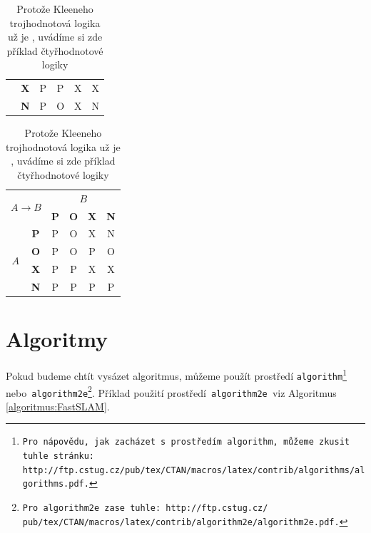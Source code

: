 \documentclass[a4paper,11pt]{article}
\begin{document}
\begin{table}[h]
\begin{center}
\begin{tabular}{|c|c|c|c|c|c|}
                    & \textbf{X} & P & P & X & X \\\cline{2-6}
                    & \textbf{N} & P & O & X & N \\\hline
\end{tabular}
\begin{tabular}{|c|c|c|c|c|c|}\hline
\multicolumn{2}{|c|}{\multirow{2}{*}{$A \rightarrow B$}} & \multicolumn{4}{c|}{$B$}\\\cline{3-6}
\multicolumn{2}{|c|}{} & \textbf{P} & \textbf{O} & \textbf{X} & \textbf{N}\\\hline
\multirow{4}{*}{$A$} & \textbf{P} & P & O & X & N \\\cline{2-6}
                    & \textbf{O} & P & O & P  & O \\\cline{2-6}
                    & \textbf{X} & P & P & X & X \\\cline{2-6}
                    & \textbf{N} & P & P & P & P \\\hline
\end{tabular}
\end{center}
\caption{Protože Kleeneho trojhodnotová logika už je , uvádíme si zde příklad čtyřhodnotové logiky}
\label{tabulka:Kleene}
\end{table}


\section{Algoritmy} 
\label{section:algoritmy}
Pokud budeme chtít vysázet algoritmus, můžeme použít prostředí \texttt{algorithm\footnote{Pro nápovědu, jak zacházet s prostředím\texttt{ algorithm, }můžeme zkusit tuhle stránku:\\
http://ftp.cstug.cz/pub/tex/CTAN/macros/latex/contrib/algorithms/algorithms.pdf.} } nebo\texttt{ algorithm2e\footnote
{Pro \texttt{algorithm2e} zase tuhle: http://ftp.cstug.cz/
pub/tex/CTAN/macros/latex/contrib/algorithm2e/algorithm2e.pdf.}}. Příklad použití prostředí\texttt{ algorithm2e }viz Algoritmus \ref{algoritmus:FastSLAM}. 
\end{document}
